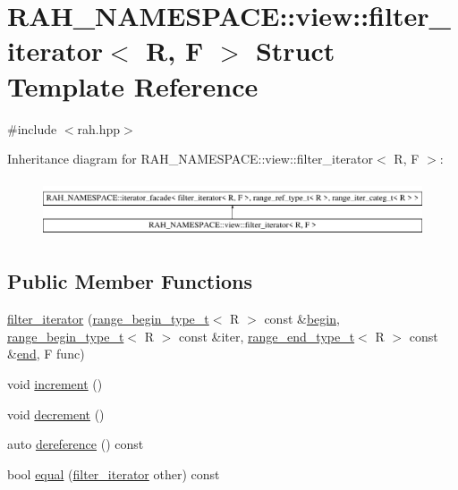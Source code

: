 \hypertarget{struct_r_a_h___n_a_m_e_s_p_a_c_e_1_1view_1_1filter__iterator}{}\section{R\+A\+H\+\_\+\+N\+A\+M\+E\+S\+P\+A\+CE\+::view\+::filter\+\_\+iterator$<$ R, F $>$ Struct Template Reference}
\label{struct_r_a_h___n_a_m_e_s_p_a_c_e_1_1view_1_1filter__iterator}


{\ttfamily \#include $<$rah.\+hpp$>$}

Inheritance diagram for R\+A\+H\+\_\+\+N\+A\+M\+E\+S\+P\+A\+CE\+::view\+::filter\+\_\+iterator$<$ R, F $>$\+:\begin{figure}[H]
\begin{center}
\leavevmode
\includegraphics[height=1.712538cm]{struct_r_a_h___n_a_m_e_s_p_a_c_e_1_1view_1_1filter__iterator}
\end{center}
\end{figure}
\subsection*{Public Member Functions}
\begin{DoxyCompactItemize}
\item 
\mbox{\hyperlink{struct_r_a_h___n_a_m_e_s_p_a_c_e_1_1view_1_1filter__iterator_ae4f5eb6b3eb823038ef8fa0d1806995a}{filter\+\_\+iterator}} (\mbox{\hyperlink{namespace_r_a_h___n_a_m_e_s_p_a_c_e_a46705781d6869d5151141f871ced1e9c}{range\+\_\+begin\+\_\+type\+\_\+t}}$<$ R $>$ const \&\mbox{\hyperlink{namespace_r_a_h___n_a_m_e_s_p_a_c_e_a40db588db40ca52dae948613525ac1b4}{begin}}, \mbox{\hyperlink{namespace_r_a_h___n_a_m_e_s_p_a_c_e_a46705781d6869d5151141f871ced1e9c}{range\+\_\+begin\+\_\+type\+\_\+t}}$<$ R $>$ const \&iter, \mbox{\hyperlink{namespace_r_a_h___n_a_m_e_s_p_a_c_e_aadeb8c12d454f4cc70bf80766871d3b2}{range\+\_\+end\+\_\+type\+\_\+t}}$<$ R $>$ const \&\mbox{\hyperlink{namespace_r_a_h___n_a_m_e_s_p_a_c_e_ad5f90a809a5221569377c400175a20bf}{end}}, F func)
\item 
void \mbox{\hyperlink{struct_r_a_h___n_a_m_e_s_p_a_c_e_1_1view_1_1filter__iterator_a3519fbd8143b3bf5402eef99d690a47a}{increment}} ()
\item 
void \mbox{\hyperlink{struct_r_a_h___n_a_m_e_s_p_a_c_e_1_1view_1_1filter__iterator_aeff224e6abd4739e22439570377ebb33}{decrement}} ()
\item 
auto \mbox{\hyperlink{struct_r_a_h___n_a_m_e_s_p_a_c_e_1_1view_1_1filter__iterator_a12c400545fa208b97848e2036cf719ee}{dereference}} () const
\item 
bool \mbox{\hyperlink{struct_r_a_h___n_a_m_e_s_p_a_c_e_1_1view_1_1filter__iterator_a22b7c003a179251a82020adf3581fb41}{equal}} (\mbox{\hyperlink{struct_r_a_h___n_a_m_e_s_p_a_c_e_1_1view_1_1filter__iterator}{filter\+\_\+iterator}} other) const
\end{DoxyCompactItemize}
